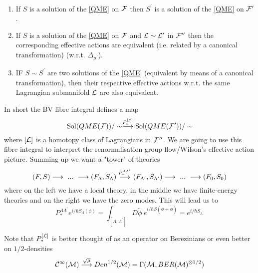 \begin{corollary}~
  \begin{enumerate}
    \item If $S$ is a solution of the \eqref{QME} on ${\mathcal{F}}$ then $S^\prime$ is a solution of the \eqref{QME} on ${\mathcal{F}}^\prime$.

    \item If $S$ is a solution of the \eqref{QME} on ${\mathcal{F}}$ and $\mathcal{L} \sim \mathcal{L}^\prime$ in ${\mathcal{F}}^{\prime\prime}$ then the corresponding effective actions are equivalent (i.e. related by a canonical transformation) (w.r.t. $\Delta_{\mu^\prime}$).

    \item IF $S \sim S^\prime$ are two solutions of the \eqref{QME} (equivalent by means of a canonical transformation), then their respective effective actions w.r.t. the same Lagrangian submanifold $\mathcal{L}$ are also equivalent.
  \end{enumerate}
\end{corollary}

In short the BV fibre integral defines a map
\begin{equation}
  \operatorname{Sol}(QME({\mathcal{F}}))/\sim \overset{P_*^{[\mathcal{L}]}}{\longrightarrow} \operatorname{Sol}(QME({\mathcal{F}}^\prime))/\sim
\end{equation}
where $[\mathcal{L}]$ is a homotopy class of Lagrangians in ${\mathcal{F}}^{\prime\prime}$. We are going to use this fibre integral to interpret the renormalisation group flow/Wilson's effective action picture. Summing up we want a "tower" of theories
\begin{equation}
  (F,S) \longrightarrow \ ... \ \longrightarrow (F_\Lambda, S_\Lambda) \overset{P_*^{\Lambda \Lambda^\prime}}{\longrightarrow} (F_{\Lambda^\prime}, S_{\Lambda^\prime}) \longrightarrow \ ... \ \longrightarrow (F_0, S_0)
\end{equation}
where on the left we have a local theory, in the middle we have finite-energy theories and on the right we have the zero modes. This will lead us to
\begin{equation}
  P_*^{\Lambda \Lambda^\prime} e^{i/\hbar S_\Lambda(\phi)} = \int_{[\Lambda, \Lambda^\prime]} D\widetilde{\phi} \ e^{i/\hbar S(\phi + \widetilde{\phi})} = e^{i/\hbar S_{\Lambda^\prime}}
\end{equation}

\begin{rem}
  Note that $P_*^{[\mathcal{L}]}$ is better thought of as an operator on Berezinians or even better on $1/2$-densities
  \begin{equation}
    \mathcal{C}^{\infty}(\mathcal{M}) \overset{\sqrt{\mu}}{\longrightarrow} Den^{1/2}(\mathcal{M}) = \Gamma(\mathcal{M}, BER(\mathcal{M})^{\otimes 1/2})
  \end{equation}
\end{rem}



